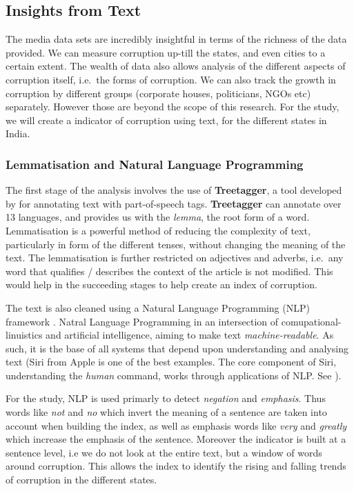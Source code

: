 \documentclass[twoside]{article}
\begin{document}
\subsection{Insights from Text}\label{insights-from-text}

The media data sets are incredibly insightful in terms of the richness
of the data provided. We can measure corruption up-till the states, and
even cities to a certain extent. The wealth of data also allows analysis
of the different aspects of corruption itself, i.e.~the forms of
corruption. We can also track the growth in corruption by different
groups (corporate houses, politicians, NGOs etc) separately. However
those are beyond the scope of this research. For the study, we will
create a indicator of corruption using text, for the different states in
India.

\subsubsection{Lemmatisation and Natural Language
Programming}\label{lemmatisation-and-natural-language-programming}

The first stage of the analysis involves the use of \textbf{Treetagger},
a tool developed by \citet{schmid1994treetagger} for annotating text
with part-of-speech tags. \textbf{Treetagger} can annotate over 13
languages, and provides us with the \emph{lemma}, the root form of a
word. Lemmatisation is a powerful method of reducing the complexity of
text, particularly in form of the different tenses, without changing the
meaning of the text. The lemmatisation is further restricted on
adjectives and adverbs, i.e.~any word that qualifies / describes the
context of the article is not modified. This would help in the
succeeding stages to help create an index of corruption.

The text is also cleaned using a Natural Language Programming (NLP)
framework \citep[See][ for a definative guide to
NLP]{manning1999foundations}. Natral Language Programming in an
intersection of comupational-linuistics and artificial intelligence,
aiming to make text \emph{machine-readable}. As such, it is the base of
all systems that depend upon understanding and analysing text (Siri from
Apple is one of the best examples. The core component of Siri,
understanding the \emph{human} command, works through applications of
NLP. See \citet{Dworetzky}).

For the study, NLP is used primarly to detect \emph{negation} and
\emph{emphasis}. Thus words like \emph{not} and \emph{no} which invert
the meaning of a sentence are taken into account when building the
index, as well as emphasis words like \emph{very} and \emph{greatly}
which increase the emphasis of the sentence. Moreover the indicator is
built at a sentence level, i.e we do not look at the entire text, but a
window of words around corruption. This allows the index to identify the
rising and falling trends of corruption in the different states.
\end{document}
